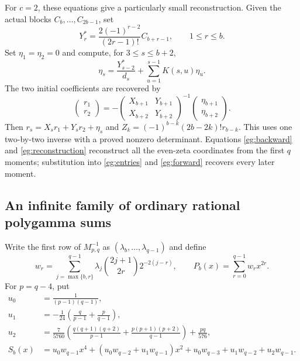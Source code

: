 For $c=2$, these equations give a particularly small reconstruction.
Given the actual blocks $C_b,\ldots,C_{2b-1}$, set
\[
 Y_r^*=\frac{2(-1)^{r-2}}{(2r-1)!}C_{b+r-1},\qquad1\le r\le b.
\]
Set $\eta_1=\eta_2=0$ and compute, for $3\le s\le b+2$,
\begin{equation}\label{eg:inhomogeneous}
 \eta_s=\frac{Y_{s-2}^*}{d_s}
          +\sum_{u=1}^{s-1}K(s,u)\eta_u.
\end{equation}
The two initial coefficients are recovered by
\begin{equation}\label{eg:reconstruction}
 \begin{pmatrix}r_1\\r_2\end{pmatrix}
 =-\begin{pmatrix}X_{b+1}&Y_{b+1}\\X_{b+2}&Y_{b+2}\end{pmatrix}^{-1}
       \begin{pmatrix}\eta_{b+1}\\\eta_{b+2}\end{pmatrix}.
\end{equation}
Then $r_s=X_sr_1+Y_sr_2+\eta_s$ and
$Z_k=(-1)^{b-k}(2b-2k)!r_{b-k}$. This uses one two-by-two inverse
with a proved nonzero determinant. Equations \eqref{eg:backward} and
\eqref{eg:reconstruction} reconstruct all the even-zeta coordinates
from the first $q$ moments; substitution into \eqref{eg:entries} and
\eqref{eg:forward} recovers every later moment.

\subsection{An infinite family of ordinary rational polygamma sums}

Write the first row of $M_{p,q}^{-1}$ as
$(\lambda_b,\ldots,\lambda_{q-1})$ and define
\begin{equation}\label{eg:ordinary-weights}
 w_r=\sum_{j=\max\{b,r\}}^{q-1}
          \lambda_j\binom{2j+1}{2r}2^{-2(j-r)},\qquad
 P_b(x)=\sum_{r=0}^{q-1}w_rx^{2r}.
\end{equation}
For $p=q-4$, put
\begin{align*}
 u_0&=\frac1{(p-1)(q-1)},\\
 u_1&=-\frac1{24}\left(\frac q{p-1}+\frac p{q-1}\right),\\
 u_2&=\frac7{5760}\left(
 \frac{q(q+1)(q+2)}{p-1}+\frac{p(p+1)(p+2)}{q-1}\right)
          +\frac{pq}{576},\\
 S_b(x)&=u_0w_{q-1}x^4
       +(u_0w_{q-2}+u_1w_{q-1})x^2
       +u_0w_{q-3}+u_1w_{q-2}+u_2w_{q-1}.
\end{align*}

